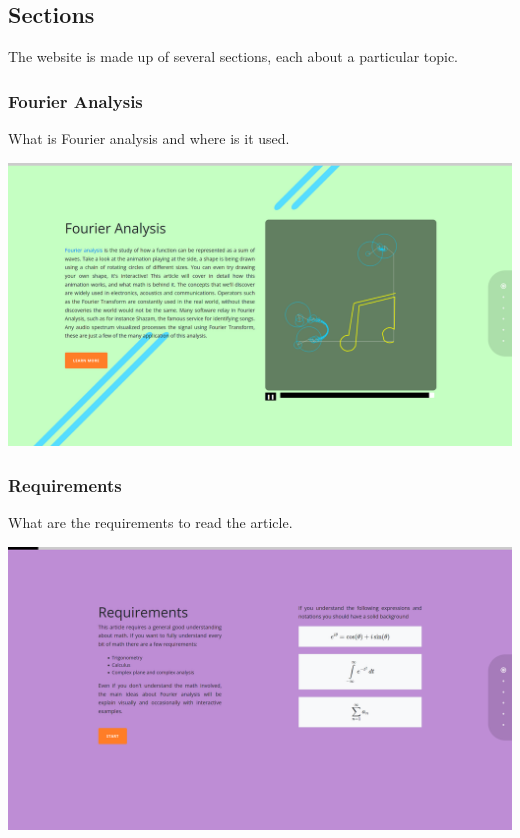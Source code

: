 \documentclass{article}
\begin{document}
\pagebreak

\subsection{Sections}

The website is made up of several sections, each about a particular topic.

\subsubsection{Fourier Analysis}

What is Fourier analysis and where is it used.

\includegraphics[width=\textwidth]{chap1.png}

\pagebreak

\subsubsection{Requirements}

What are the requirements to read the article.

\includegraphics[width=\textwidth]{chap2.png}
\end{document}
